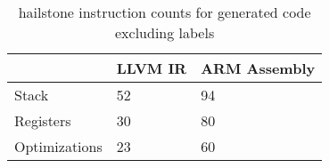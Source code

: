 \begin{table}[h!]
\centering
\begin{tabular}{p{}p{}p{}}
  \hline
 & LLVM IR & ARM Assembly \\ 
  \hline
Stack &  52 &  94 \\ 
  Registers &  30 &  80 \\ 
  Optimizations &  23 &  60 \\ 
   \hline
\end{tabular}
\caption{hailstone instruction counts for generated code excluding labels}
\end{table}

